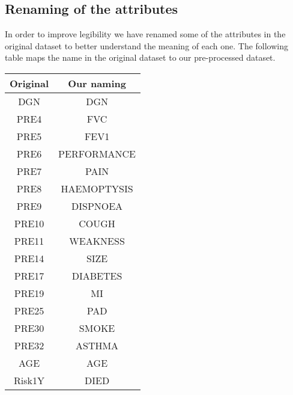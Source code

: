 %


\subsection{Renaming of the attributes}

In order to improve legibility we have renamed some of the attributes in the original dataset to better understand the meaning of each one. The following table maps the name in the original dataset to our pre-processed dataset.

\begin{center}

\begin{tabular}{|c|c|}
    \hline
    \textbf{Original} & \textbf{Our naming} \\ \hline\hline
    DGN & DGN \\ \hline
    PRE4 & FVC \\ \hline
    PRE5 & FEV1 \\ \hline
    PRE6 & PERFORMANCE \\ \hline
    PRE7 & PAIN \\ \hline
    PRE8 & HAEMOPTYSIS \\ \hline
    PRE9 & DISPNOEA \\ \hline
    PRE10 & COUGH \\ \hline
    PRE11 & WEAKNESS \\ \hline
    PRE14 & SIZE \\ \hline
    PRE17 & DIABETES \\ \hline
    PRE19 & MI \\ \hline
    PRE25 & PAD \\ \hline
    PRE30 & SMOKE \\ \hline
    PRE32 & ASTHMA \\ \hline
    AGE & AGE \\ \hline
    Risk1Y & DIED \\ \hline

\end{tabular}
\end{center}



